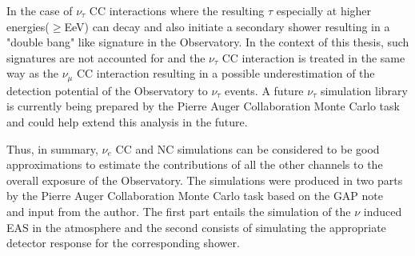 In the case of $\nu_{\tau}$ CC interactions where the resulting $\tau$ especially at higher energies($\geq $EeV) can decay and also initiate a secondary shower resulting in a "double bang" like signature in the Observatory. In the context of this thesis, such signatures are not accounted for and the $\nu_{\tau}$ CC interaction is treated in the same way as the $\nu_{\mu}$ CC interaction resulting in a possible underestimation of the detection potential of the Observatory to $\nu_{\tau}$ events. A future $\nu_{\tau}$ simulation library is currently being prepared by the Pierre Auger Collaboration Monte Carlo task and could help extend this analysis in the future.

Thus, in summary, $\nu_e$ CC and NC simulations can be considered to be good approximations to estimate the contributions of all the other channels to the overall exposure of the Observatory. The simulations were produced in two parts by the Pierre Auger Collaboration Monte Carlo task based on the GAP note~\cite{gap_note_2013} and input from the author. The first part entails the simulation of the $\nu$ induced EAS in the atmosphere and the second consists of simulating the appropriate detector response for the corresponding shower. 

